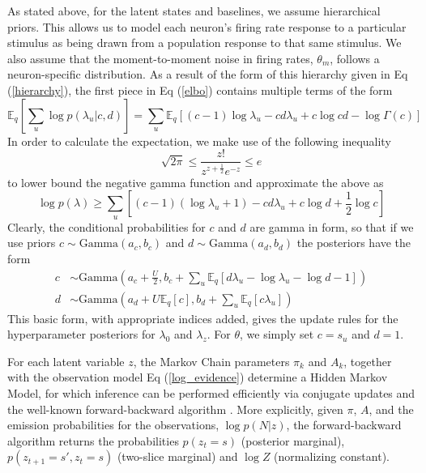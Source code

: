 \documentclass[12pt,a4paper]{article}
\begin{document}
As stated above, for the latent states and baselines, we assume hierarchical priors. This allows us to model each neuron's firing rate response to a particular stimulus as being drawn from a population response to that same stimulus. We also assume that the moment-to-moment noise in firing rates, $\theta_m$, follows a neuron-specific distribution. As a result of the form of this hierarchy given in Eq (\ref{hierarchy}), the first piece in Eq (\ref{elbo}) contains multiple terms of the form
\begin{equation}
    \mathbb{E}_q \left[\sum_u \log p(\lambda_u|c, d)\right] = \sum_u \mathbb{E}_q \left[
    (c - 1) \log \lambda_u - cd\lambda_u + c \log cd - \log \Gamma(c)
    \right]
\end{equation}
In order to calculate the expectation, we make use of the following inequality \cite{abramowitz1964handbook}
\begin{equation}
    \sqrt{2\pi} \le \frac{z!}{z^{z+\frac{1}{2}} e^{-z}} \le e
\end{equation}
to lower bound the negative gamma function and approximate the above as
\begin{equation}
    \log p(\lambda) \ge \sum_u \left[
    (c - 1) (\log \lambda_u + 1) - cd\lambda_u + c \log d + \frac{1}{2}\log c\right]
\end{equation}
Clearly, the conditional probabilities for $c$ and $d$ are gamma in form, so that if we use priors $c \sim \text{Gamma}(a_c, b_c)$ and $d\sim \text{Gamma}(a_d, b_d)$ the posteriors have the form
\begin{align}
    c &\sim \text{Gamma}\left(a_c + \frac{U}{2},
    b_c + \sum_u\mathbb{E}_q
        \left[d \lambda_u - \log \lambda_u - \log d - 1\right]\right) \\
    d &\sim \text{Gamma}\left(
        a_d + U\mathbb{E}_q[c], b_d + \sum_u \mathbb{E}_q [c \lambda_u]
    \right)
\end{align}
This basic form, with appropriate indices added, gives the update rules for the hyperparameter posteriors for $\lambda_0$ and $\lambda_z$. For $\theta$, we simply set $c = s_u$ and $d = 1$.

For each latent variable $z$, the Markov Chain parameters $\pi_k$ and $A_k$, together with the observation model Eq (\ref{log_evidence}) determine a Hidden Markov Model, for which inference can be performed efficiently via conjugate updates and the well-known forward-backward algorithm \cite{beal2003variational}. More explicitly, given $\pi$, $A$, and the emission probabilities for the observations, $\log p(N|z)$, the forward-backward algorithm returns the probabilities $p(z_t=s)$ (posterior marginal), $p(z_{t+1} =s', z_t=s)$ (two-slice marginal) and $\log Z$ (normalizing constant).
\end{document}
